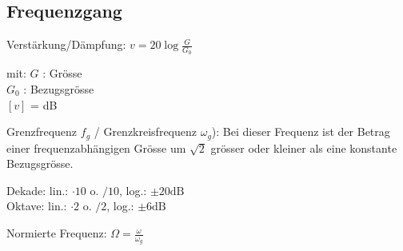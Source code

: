 \begin{sectionbox}
	\subsection{Frequenzgang}
	\begin{emphbox}
		Verstärkung/Dämpfung: $v = 20\log \frac{G}{G_0}$
	\end{emphbox}
	mit:
	$G$ : Grösse\\
	$G_0$ : Bezugsgrösse\\
	$[v]$ = dB
	
	Grenzfrequenz $f_g$ / Grenzkreisfrequenz $\omega_g$):
	Bei dieser Frequenz ist der Betrag einer frequenzabhängigen Grösse	um $\sqrt{2}$ grösser oder kleiner als eine konstante Bezugsgrösse.
	
	
	Dekade: lin.: $\cdot 10$ o. $/10$, log.: $\pm 20 \si{\dB}$\\
	Oktave:	lin.: $\cdot 2$ o. $/2$, log.: $\pm 6 \si{\dB}$
	\begin{emphbox}
		Normierte Frequenz: $\Omega = \frac{\omega}{\omega_g}$
	\end{emphbox}

\end{sectionbox}

\begin{sectionbox}
	



\end{sectionbox}
